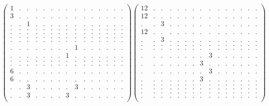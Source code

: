 \documentclass[12pt,a4paper]{amsart}
\begin{document}
\begin{align*}
\left(\begin{array}{rrrrrrrrrrrrrrr}%
1&.&.&.&.&.&.&.&.&.&.&.&.&.&.\\%
3&.&.&.&.&.&.&.&.&.&.&.&.&.&.\\%
.&.&1&.&.&.&.&.&.&.&.&.&.&.&.\\%
.&.&.&.&.&.&.&.&.&.&.&.&.&.&.\\%
.&.&.&.&.&.&.&.&.&.&.&.&.&.&.\\%
.&.&.&.&.&.&.&.&.&.&.&.&.&.&.\\%
.&.&.&.&.&.&.&.&.&.&.&.&.&.&.\\%
.&.&.&.&.&.&.&.&1&.&.&.&.&.&.\\%
.&.&.&.&.&.&.&1&.&.&.&.&.&.&.\\%
.&.&.&.&.&.&.&.&.&.&.&.&.&.&.\\%
.&.&.&.&.&.&.&.&.&.&.&.&.&.&.\\%
6&.&.&.&.&.&.&.&.&.&.&.&.&.&.\\%
6&.&.&.&.&.&.&.&.&.&.&.&.&.&.\\%
.&.&3&.&.&.&.&.&3&.&.&.&.&.&.\\%
.&.&3&.&.&.&.&3&.&.&.&.&.&.&.\\%
\end{array}\right)%
\left(\begin{array}{rrrrrrrrrrrrrrr}%
12&.&.&.&.&.&.&.&.&.&.&.&.&.&.\\%
12&.&.&.&.&.&.&.&.&.&.&.&.&.&.\\%
.&.&3&.&.&.&.&.&.&.&.&.&.&.&.\\%
12&.&.&.&.&.&.&.&.&.&.&.&.&.&.\\%
.&.&3&.&.&.&.&.&.&.&.&.&.&.&.\\%
.&.&.&.&.&.&.&.&.&.&.&.&.&.&.\\%
.&.&.&.&.&.&.&.&.&.&.&.&.&.&.\\%
.&.&.&.&.&.&.&.&3&.&.&.&.&.&.\\%
.&.&.&.&.&.&.&3&.&.&.&.&.&.&.\\%
.&.&.&.&.&.&.&.&3&.&.&.&.&.&.\\%
.&.&.&.&.&.&.&3&.&.&.&.&.&.&.\\%
.&.&.&.&.&.&.&.&.&.&.&.&.&.&.\\%
.&.&.&.&.&.&.&.&.&.&.&.&.&.&.\\%
.&.&.&.&.&.&.&.&.&.&.&.&.&.&.\\%
.&.&.&.&.&.&.&.&.&.&.&.&.&.&.\\%
\end{array}\right)%
\end{align*}
\end{document}
